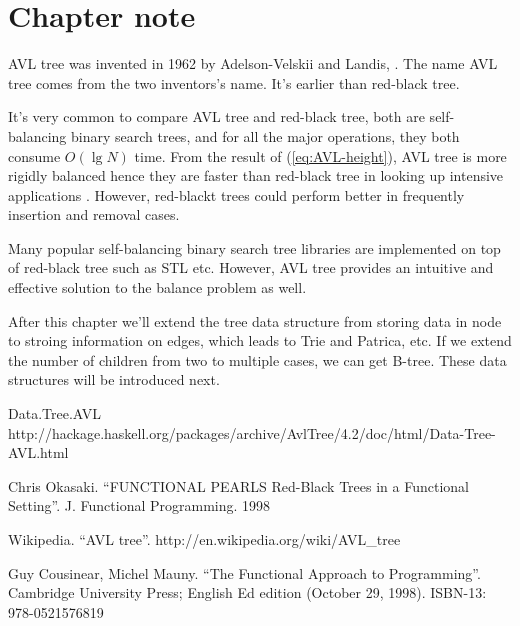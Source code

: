 \documentclass{article}
\begin{document}
\section{Chapter note}
AVL tree was invented in 1962 by Adelson-Velskii and Landis\cite{wiki}, 
\cite{TFATP}. The name AVL tree comes from the two inventors's name. It's earlier than red-black tree.

It's very common to compare AVL tree and red-black tree, both are self-balancing binary search trees, and for all the major operations, they both consume $O(\lg N)$ time. From the result of (\ref{eq:AVL-height}), AVL tree is more rigidly balanced hence they are faster than red-black tree in looking up intensive applications \cite{wiki}. However, red-blackt trees could perform better in frequently insertion and removal cases.

Many popular self-balancing binary search tree libraries are implemented on top of red-black tree such as STL etc. However, AVL tree provides an intuitive and effective solution to the balance problem as well.

After this chapter we'll extend the tree data structure from storing data in node to stroing information on edges, which leads to Trie and Patrica, etc. If we extend the number of children from two to multiple cases, we can get B-tree. These data structures will be introduced next.

\begin{thebibliography}{99}

Data.Tree.AVL http://hackage.haskell.org/packages/archive/AvlTree/4.2/doc/html/Data-Tree-AVL.html

Chris Okasaki. ``FUNCTIONAL PEARLS Red-Black Trees in a Functional Setting''. J. Functional Programming. 1998

Wikipedia. ``AVL tree''. http://en.wikipedia.org/wiki/AVL\_tree

Guy Cousinear, Michel Mauny. ``The Functional Approach to Programming''. Cambridge University Press; English Ed edition (October 29, 1998). ISBN-13: 978-0521576819

\end{thebibliography}

\ifx\wholebook\relax\else
\end{document}
